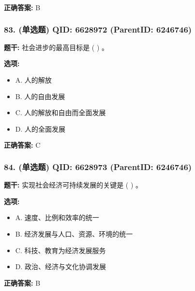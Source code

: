 \documentclass[12pt,UTF8]{ctexart}
\begin{document}
\textbf{正确答案:}
B

\vspace{0.3em}\hrulefill\vspace{0.7em}

\subsubsection*{83. (单选题) \small QID: 6628972 (ParentID: 6246746)}

\textbf{题干:}
社会进步的最高目标是  ( )  。



\textbf{选项:}
\begin{itemize}[leftmargin=*]

  \item A. 人的解放

  \item B. 人的自由发展

  \item C. 人的解放和自由而全面发展

  \item D. 人的全面发展

\end{itemize}

\textbf{正确答案:}
C

\vspace{0.3em}\hrulefill\vspace{0.7em}

\subsubsection*{84. (单选题) \small QID: 6628973 (ParentID: 6246746)}

\textbf{题干:}
实现社会经济可持续发展的关键是  ( )  。



\textbf{选项:}
\begin{itemize}[leftmargin=*]

  \item A. 速度、比例和效率的统一

  \item B. 经济发展与人口、资源、环境的统一

  \item C. 科技、教育为经济发展服务

  \item D. 政治、经济与文化协调发展

\end{itemize}

\textbf{正确答案:}
B
\end{document}
